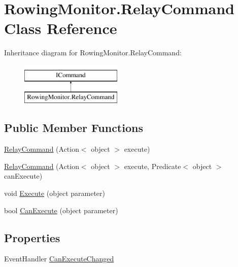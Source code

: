 \hypertarget{class_rowing_monitor_1_1_relay_command}{}\section{Rowing\+Monitor.\+Relay\+Command Class Reference}
\label{class_rowing_monitor_1_1_relay_command}
Inheritance diagram for Rowing\+Monitor.\+Relay\+Command\+:\begin{figure}[H]
\begin{center}
\leavevmode
\includegraphics[height=2.000000cm]{class_rowing_monitor_1_1_relay_command}
\end{center}
\end{figure}
\subsection*{Public Member Functions}
\begin{DoxyCompactItemize}
\item 
\hyperlink{class_rowing_monitor_1_1_relay_command_a489257b2b64ff595ac8cf6f4dea07822}{Relay\+Command} (Action$<$ object $>$ execute)
\item 
\hyperlink{class_rowing_monitor_1_1_relay_command_a683db6291fb9d78a125cff700be862d6}{Relay\+Command} (Action$<$ object $>$ execute, Predicate$<$ object $>$ can\+Execute)
\item 
void \hyperlink{class_rowing_monitor_1_1_relay_command_ac4ca734c8e04bfb87cf1a1c295fb2d5b}{Execute} (object parameter)
\item 
bool \hyperlink{class_rowing_monitor_1_1_relay_command_a85fe9d9b44a1db38da8e1330d6715b30}{Can\+Execute} (object parameter)
\end{DoxyCompactItemize}
\subsection*{Properties}
\begin{DoxyCompactItemize}
\item 
Event\+Handler \hyperlink{class_rowing_monitor_1_1_relay_command_ae4dd035ea91a110089885a49c15fa525}{Can\+Execute\+Changed}
\end{DoxyCompactItemize}


